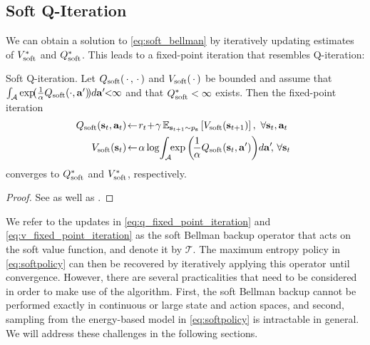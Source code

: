 \documentclass{article}
\begin{document}
\vspace{-3mm}
\subsection{Soft Q-Iteration}
\vspace{-2mm}

We can obtain a solution to \autoref{eq:soft_bellman} by iteratively updating estimates of $V_\mathrm{soft}^*$ and $Q_\mathrm{soft}^*$. This leads to a fixed-point iteration that resembles Q-iteration:
\begin{theorem}
\label{the:soft_q_iteration}
Soft Q-iteration. Let $Q_\mathrm{soft}(\,\cdot\,, \,\cdot\,)$ and $V_\mathrm{soft}(\,\cdot\,)$ be bounded and assume that $\int_{\mathcal{A}}\exp\!(\frac{1}{\alpha}Q_\mathrm{soft}(\cdot, \mathbf{a}')\!)d\mathbf{a}'\!\! <\!\! \infty$ and that $Q_\mathrm{soft}^* < \infty$ exists. Then the fixed-point iteration 
\begin{align}
\!\!\Qsoft(\st, \at) &\!\leftarrow\! \rt \!+\! \gamma \E{\stp\sim\pdyn}{\Vsoft(\stp)},\ \forall \st, \at\label{eq:q_fixed_point_iteration}\\
\Vsoft(\st) &\!\leftarrow\! \temp\log\!\int_{\aspace}\!\! \exp\left(\!\frac{1}{\temp}\Qsoft(\st, \action')\right)\!d\action'\!,\ \!\forall \st\label{eq:v_fixed_point_iteration}
\end{align}
converges to $Q_\mathrm{soft}^*$ and $V_\mathrm{soft}^*$, respectively.
\end{theorem}
\begin{proof}
\vspace{-2mm}
See  as well as \cite{fox2015taming}.
\end{proof}
\vspace{-2mm}
We refer to the updates in \autoref{eq:q_fixed_point_iteration} and \eqref{eq:v_fixed_point_iteration} as the soft Bellman backup operator that acts on the soft value function, and denote it by $\mathcal{T}$. The maximum entropy policy in \autoref{eq:softpolicy} can then be recovered by iteratively applying this operator until convergence. However, there are several practicalities that need to be considered in order to make use of the algorithm. First, the soft Bellman backup cannot be performed exactly in continuous or large state and action spaces, and second, sampling from the energy-based model in \autoref{eq:softpolicy} is intractable in general. We will address these challenges in the following sections.

\vspace{-2mm}
\end{document}
